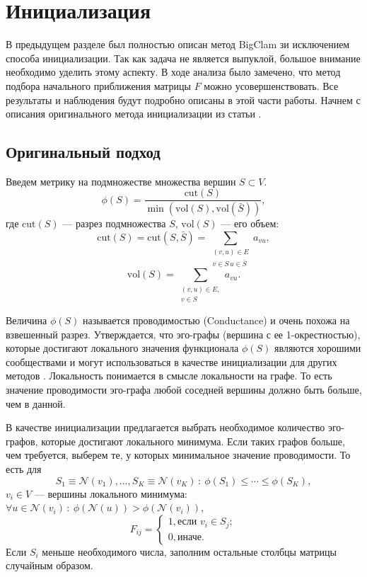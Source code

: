 \documentclass{ITaSconf}
\begin{document}
\section{Инициализация}

В предыдущем разделе был полностью описан метод BigClam зи исключением способа инициализации. 
Так как задача не является выпуклой, большое внимание необходимо уделить этому аспекту. 
В ходе анализа было замечено, что метод подбора начального приближения матрицы $F$ можно усовершенствовать. 
Все результаты и наблюдения будут подробно описаны в этой части работы. 
Начнем с описания оригинального метода инициализации из статьи \cite{gleich2011neighborhoods}. 

\subsection{Оригинальный подход}

Введем метрику на подмножестве множества вершин $ S \subset V $.
$$\phi(S) = \dfrac{\mathrm{cut}(S)}{\min(\mathrm{vol}(S), \mathrm{vol}( \bar S))},$$
где $\mathrm{cut}(S)$ --- разрез подмножества $S$, $\mathrm{vol}(S)$ --- его объем:
$$\mathrm{cut}(S) = \mathrm{cut}(S, \bar S)=\sum_{\substack{(v,u)\in E\\ v \in S \, u \in \bar S}} a_{vu},$$
$$\mathrm{vol}(S) =\sum_{\substack{(v,u)\in E,\\ v \in S}} a_{vu}.$$

Величина $\phi(S)$ называется проводимостью (Conductance) и очень похожа на взвешенный разрез.
Утверждается, что эго-графы (вершина с ее 1-окрестностью), которые достигают локального значения функционала $\phi(S)$ являются хорошими сообществами и могут использоваться в качестве инициализации для других методов \cite{gleich2011neighborhoods}.
Локальность понимается в смысле локальности на графе. 
То есть значение проводимости эго-графа любой соседней вершины должно быть больше, чем в данной. 

В качестве инициализации предлагается выбрать необходимое количество эго-графов, которые достигают локального минимума. Если таких графов больше, чем требуется, выберем те, у которых минимальное значение проводимости.
То есть для 
$$S_1 \equiv \mathcal{N}(v_1), \dots, S_K \equiv \mathcal{N}(v_K)\,:\:\phi(S_1) \le \cdots \le \phi(S_K),$$
$v_i \in V$ --- вершины локального минимума: $\forall u \in \mathcal{N}(v_i) \, : \: \phi(\mathcal{N}(u)) > \phi(\mathcal{N}(v_i))$,
$$ 
F_{ij}=	
\begin{cases} 	1,  \text{если } v_i \in S_j;\\
0,  \text{иначе. } 
\end{cases}
$$
Если $S_i$ меньше необходимого числа, заполним остальные столбцы матрицы случайным образом.
\end{document}
